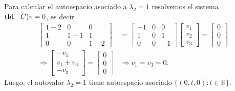 \begin{enumerate}[topsep=6pt,itemsep=.4cm]
    Para calcular el autoespacio asociado a $\lambda_2=1$ resolvemos el sistema  $(\operatorname{Id}-C)v=0$, es decir
    \begin{align*}
        \begin{bmatrix} 1-2 & 0 & 0\\ 1 & 1-1 & 1\\ 0 & 0 & 1-2 \end{bmatrix} &= \begin{bmatrix} -1 & 0 & 0\\ 1 & 0 & 1\\ 0 & 0 & -1 \end{bmatrix} \begin{bmatrix} v_1\\ v_2 \\ v_3\end{bmatrix} = \begin{bmatrix} 0\\ 0 \\ 0\end{bmatrix} \\
        \Rightarrow \begin{bmatrix} -v_1\\ v_1+v_3 \\ -v_3 \end{bmatrix} = \begin{bmatrix} 0\\ 0 \\ 0\end{bmatrix} &\Rightarrow v_1=v_3=0.
    \end{align*}
    Luego,  el autovalor $\lambda_2=1$ tiene autoespacio asociado $\{(0,t,0): t\in\mathbb{R}\}$.

    


\end{enumerate}
